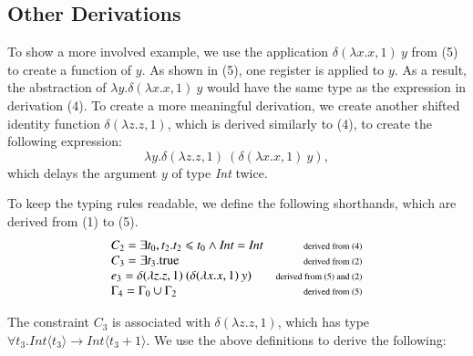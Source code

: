 \subsection{Other Derivations}
To show a more involved example, we use the application $\delta(\lambda x.x,1) \: y$ from {\scriptsize (5)} to create a function of $y$.
As shown in {\scriptsize (5)}, one register is applied to $y$.
As a result, the abstraction of $\lambda y. \delta(\lambda x.x,1) \: y$ would have the same type as the expression in derivation {\scriptsize (4)}.
To create a more meaningful derivation, we create another shifted identity function $\delta(\lambda z.z,1)$, which is derived similarly to {\scriptsize (4)}, to create the following expression:
\[ \lambda y.\delta(\lambda z.z,1) \: (\delta(\lambda x.x,1) \: y),\]
which delays the argument $y$ of type \textit{Int} twice.

To keep the typing rules readable, we define the following shorthands, which are derived from {\scriptsize (1)} to {\scriptsize (5)}.
\[ \begin{array}{l r} 
      C_2 = \exists t_0,t_2.t_2 \leq t_0 \land \textit{Int} = \textit{Int} & \text{\scriptsize derived from (4)}\\
      C_3 = \exists t_3.\text{true} & \text{\scriptsize derived from (2)}\\ 
      e_3 = \delta(\lambda z.z,1) \: (\delta(\lambda x.x,1) \: y) & \text{\scriptsize derived from (5) and (2)}\\
      \Gamma_4 = \Gamma_0 \cup \Gamma_2 & \text{\scriptsize derived from (5)}\\
   \end{array}
\]

The constraint $C_3$ is associated with $\delta(\lambda z.z,1)$, which has type $\forall t_3. \textit{Int}\langle t_3 \rangle \to \textit{Int}\langle t_3 + 1\rangle$.
We use the above definitions to derive the following:

\begin{prooftree}
\end{prooftree}

